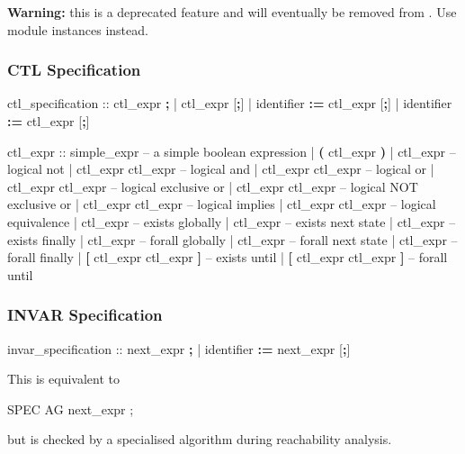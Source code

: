 \textbf{Warning:} this is a deprecated feature and will eventually be removed from \nusmv. Use module instances instead.


\subsubsection{CTL Specification}
\begin{Grammar}
ctl_specification ::  ctl_expr \textbf{;}
                   |  ctl_expr [\textbf{;}]
                   |   identifier \textbf{:=} ctl_expr [\textbf{;}]
                   |   identifier \textbf{:=} ctl_expr [\textbf{;}]
\end{Grammar}

\begin{Grammar}
ctl_expr ::
    simple_expr                 -- a simple boolean expression
    | \textbf{(} ctl_expr \textbf{)}
    | \operator{!} ctl_expr                -- logical not
    | ctl_expr \operator{\&} ctl_expr       -- logical and
    | ctl_expr \operator{|} ctl_expr       -- logical or
    | ctl_expr  ctl_expr     -- logical exclusive or
    | ctl_expr  ctl_expr    -- logical NOT exclusive or
    | ctl_expr \operator{->} ctl_expr      -- logical implies
    | ctl_expr \operator{<->} ctl_expr     -- logical equivalence
    |  ctl_expr               -- exists globally
    |  ctl_expr               -- exists next state
    |  ctl_expr               -- exists finally
    |  ctl_expr               -- forall globally
    |  ctl_expr               -- forall next state
    |  ctl_expr               -- forall finally
    |  \textbf{[} ctl_expr  ctl_expr \textbf{]} -- exists until
    |  \textbf{[} ctl_expr  ctl_expr \textbf{]} -- forall until
\end{Grammar}


\subsubsection{INVAR Specification}
\begin{Grammar}
invar_specification ::  next_expr \textbf{;}
                     |   identifier \textbf{:=} next_expr [\textbf{;}]
\end{Grammar}

This is equivalent to 
%
\begin{Grammar}
SPEC  AG next_expr ;
\end{Grammar}
%
but is checked by a specialised algorithm during reachability analysis.


